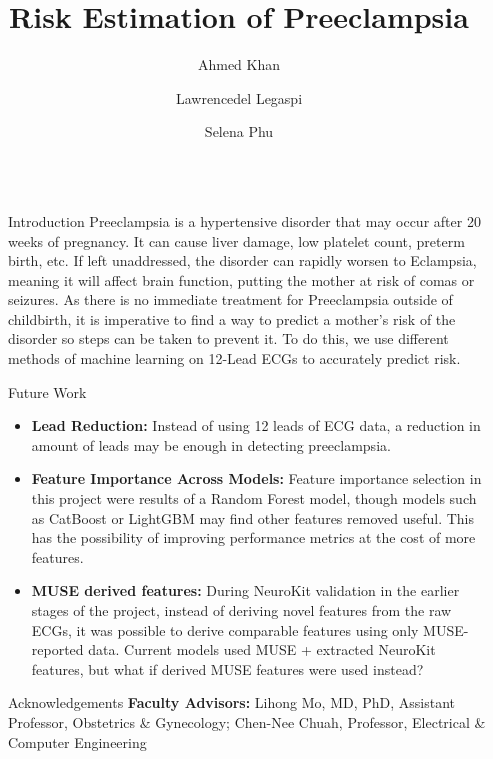 \documentclass[final]{beamer}
\title{Risk Estimation of Preeclampsia}
\author{Ahmed Khan \and Lawrencedel Legaspi \and Selena Phu}
\institute[shortinst]{Department of Electrical and Computer Engineering}
\newlength{\sepwidth}
\newlength{\colwidth}
\newcommand{\separatorcolumn}{\begin{column}{\sepwidth}\end{column}}
\begin{document}
\begin{frame}[t]
\begin{columns}[t]
\separatorcolumn

\begin{column}{\colwidth}

  \begin{block}{Introduction}
    Preeclampsia is a hypertensive disorder that may occur after 20 weeks of pregnancy. It can cause liver damage, low platelet count, preterm birth, etc. If left unaddressed, the disorder can rapidly worsen to Eclampsia, meaning it will affect brain function, putting the mother at risk of comas or seizures. As there is no immediate treatment for Preeclampsia outside of childbirth, it is imperative to find a way to predict a mother's risk of the disorder so steps can be taken to prevent it. To do this, we use different methods of machine learning on 12-Lead ECGs to accurately predict risk.
  \end{block}

  \begin{block}{Future Work}
    \begin{itemize}
      \item \textbf{Lead Reduction:} Instead of using 12 leads of ECG data, a reduction in amount of leads may be enough in detecting preeclampsia.
      \item \textbf{Feature Importance Across Models:} Feature importance selection in this project were results of a Random Forest model, though models such as CatBoost or LightGBM may find other features removed useful. This has the possibility of improving performance metrics at the cost of more features.
      \item \textbf{MUSE derived features:} During NeuroKit validation in the earlier stages of the project, instead of deriving novel features from the raw ECGs, it was possible to derive comparable features using only MUSE-reported data. Current models used MUSE + extracted NeuroKit features, but what if derived MUSE features were used instead?
    \end{itemize}
  \end{block}

  \begin{block}{Acknowledgements}
    \textbf{Faculty Advisors:} Lihong Mo, MD, PhD, Assistant Professor, Obstetrics \& Gynecology; Chen-Nee Chuah, Professor, Electrical \& Computer Engineering


\end{block}
\end{column}
\end{columns}
\end{frame}
\end{document}

